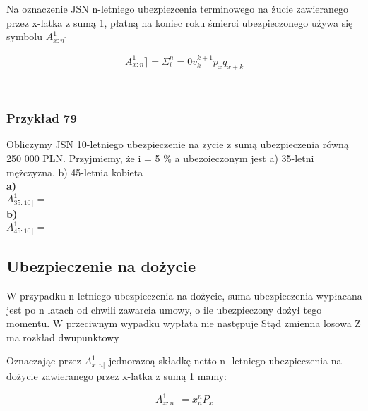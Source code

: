 \documentclass{article}
\begin{document}
Na oznaczenie JSN n-letniego ubezpiezcenia terminowego na żucie zawieranego przez x-latka z sumą 1, płatną na koniec roku śmierci ubezpieczonego używa się symbolu $ A^1_{x:n \rceil} $\\

\begin{center}
	\begin{equation}
		A^1_{x:n} \rceil = \Sigma ^{n}_i=0 v^{k+1} _kp_x q_{x+k}
	\end{equation}
\end{center}\\

\subsubsection{Przykład 79}

Obliczymy JSN 10-letniego ubezpieczenie na zycie z sumą ubezpieczenia równą 250 000 PLN. Przyjmiemy, że i = 5 \% a ubezoieczonym jest a) 35-letni mężczyzna, b) 45-letnia kobieta\\

\textbf{a)}\\

$ A^1_{35:10 \rceil} = $\\

\textbf{b)}\\

$ A^1_{45:10 \rceil} =  $\\

\newpage

\subsection{Ubezpieczenie na dożycie}

W przypadku n-letniego ubezpieczenia na dożycie, suma ubezpieczenia wypłacana jest po n latach od chwili zawarcia umowy, o ile ubezpieczony dożył tego momentu. W przeciwnym wypadku wypłata nie następuje Stąd zmienna losowa Z ma rozkład dwupunktowy

Oznaczając przez $ A_{x:n|} ^1 $ jednorazoą składkę netto n- letniego ubezpieczenia na dożycie zawieranego przez x-latka z sumą 1 mamy:

\begin{center}
	\begin{equation}
		A^1_{x:n} \rceil = x^n _nP_x
	\end{equation}
\end{center}\\
\end{document}
